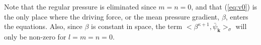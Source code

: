 \documentclass[preprint]{elsarticle}
\newcommand{\D}[1]{\bar{#1}}
\begin{document}
Note that the regular pressure is eliminated since $m=n=0$, and that (\ref{eq:v0}) is the only place where the driving force, or the mean pressure gradient, $\beta$, enters the equations. Also, since $\beta$ is constant in space, the term $<\beta^{\kappa+1}, \D{\psi}_{\bm{k}} >_{\sigma}$ will only be non-zero for $l=m=n=0$. 
\end{document}
